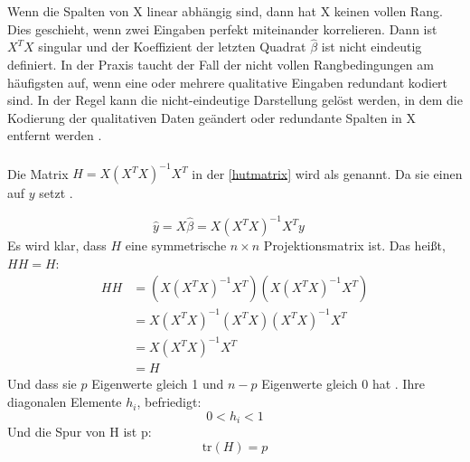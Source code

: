 Wenn die Spalten von X linear abhängig sind, dann hat X keinen vollen Rang. Dies geschieht, wenn zwei Eingaben perfekt miteinander korrelieren. Dann ist \(X^TX\) singular und der Koeffizient der letzten Quadrat $\hat{\beta}$ ist nicht eindeutig definiert. In der Praxis taucht der Fall der nicht vollen Rangbedingungen am häufigsten auf, wenn eine oder mehrere qualitative Eingaben redundant kodiert sind. In der Regel kann die nicht-eindeutige Darstellung gelöst werden, in dem die Kodierung der qualitativen Daten geändert oder redundante Spalten in X entfernt werden   \cite{hastie2009elements}. \\\\
Die Matrix \( H = X (X^T X)^{-1} X^T \) in der \autoref{hutmatrix} wird als  genannt. Da sie einen  auf \(y\) setzt \cite{huber1981robust}. 

\begin{equation}
\hat{y} = X \hat{\beta} = X(X^T X)^{-1} X^T y \quad 
\label{hutmatrix}
\end{equation}
Es wird klar, dass \(H\) eine symmetrische \( n \times n \) Projektionsmatrix ist. Das heißt, \( HH = H \): 
\begin{equation}
\begin{aligned}
H H &= \left( X (X^T X)^{-1} X^T \right) \left( X (X^T X)^{-1} X^T \right) \\
&= X (X^T X)^{-1} (X^T X) (X^T X)^{-1} X^T \\
&= X (X^T X)^{-1} X^T \\
&= H
\end{aligned}
\label{eq:idempotent}
\end{equation}
Und dass sie \(p\) Eigenwerte gleich 1 und \( n - p \) Eigenwerte gleich 0 hat \cite{huber1981robust}. Ihre diagonalen Elemente \(h_i\), befriedigt:
\begin{equation}
0 < h_i < 1  \label{eq:hi_condition}
\end{equation}
Und die Spur von H ist p: 
\begin{equation}
\text{tr}(H) = p \label{eq:trace_H}
\end{equation}

